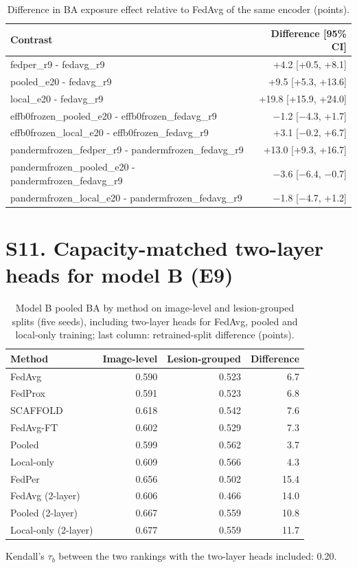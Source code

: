 \documentclass[10pt]{article}
\begin{document}
\begin{table}[!htbp]
\centering
\scriptsize
\caption{Difference in BA exposure effect relative to FedAvg of the same encoder (points).}
\label{tab:s11c}
\begin{tabular}{@{}lr@{}}
\toprule
Contrast & Difference [95\% CI] \\
\midrule
fedper\_r9 - fedavg\_r9 & +4.2 [+0.5, +8.1] \\
pooled\_e20 - fedavg\_r9 & +9.5 [+5.3, +13.6] \\
local\_e20 - fedavg\_r9 & +19.8 [+15.9, +24.0] \\
effb0frozen\_pooled\_e20 - effb0frozen\_fedavg\_r9 & $-$1.2 [$-$4.3, +1.7] \\
effb0frozen\_local\_e20 - effb0frozen\_fedavg\_r9 & +3.1 [$-$0.2, +6.7] \\
pandermfrozen\_fedper\_r9 - pandermfrozen\_fedavg\_r9 & +13.0 [+9.3, +16.7] \\
pandermfrozen\_pooled\_e20 - pandermfrozen\_fedavg\_r9 & $-$3.6 [$-$6.4, $-$0.7] \\
pandermfrozen\_local\_e20 - pandermfrozen\_fedavg\_r9 & $-$1.8 [$-$4.7, +1.2] \\
\bottomrule
\end{tabular}
\end{table}
\section*{S11. Capacity-matched two-layer heads for model B (E9)}
\begin{table}[!htbp]
\centering
\footnotesize
\caption{Model B pooled BA by method on image-level and lesion-grouped splits (five seeds), including two-layer heads for FedAvg, pooled and local-only training; last column: retrained-split difference (points).}
\label{tab:s12}
\begin{tabular}{@{}lrrr@{}}
\toprule
Method & Image-level & Lesion-grouped & Difference \\
\midrule
FedAvg & 0.590 & 0.523 & 6.7 \\
FedProx & 0.591 & 0.523 & 6.8 \\
SCAFFOLD & 0.618 & 0.542 & 7.6 \\
FedAvg-FT & 0.602 & 0.529 & 7.3 \\
Pooled & 0.599 & 0.562 & 3.7 \\
Local-only & 0.609 & 0.566 & 4.3 \\
FedPer & 0.656 & 0.502 & 15.4 \\
FedAvg (2-layer) & 0.606 & 0.466 & 14.0 \\
Pooled (2-layer) & 0.667 & 0.559 & 10.8 \\
Local-only (2-layer) & 0.677 & 0.559 & 11.7 \\
\bottomrule
\end{tabular}
\end{table}
Kendall's $\tau_b$ between the two rankings with the two-layer heads included: 0.20.
\end{document}
